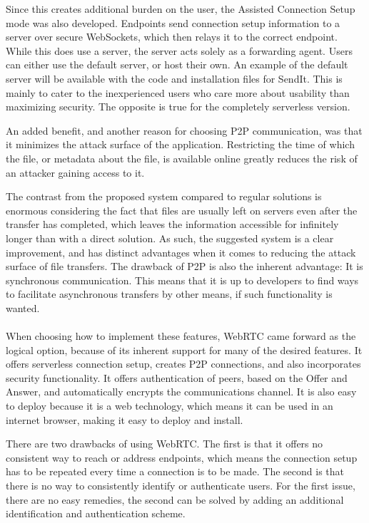 Since this creates additional burden on the user, the Assisted Connection Setup mode was also developed. Endpoints send connection setup information to a server over secure WebSockets, which then relays it to the correct endpoint. While this does use a server, the server acts solely as a forwarding agent. Users can either use the default server, or host their own. An example of the default server will be available with the code and installation files for SendIt. This is mainly to cater to the inexperienced users who care more about usability than maximizing security. The opposite is true for the completely serverless version.

An added benefit, and another reason for choosing P2P communication, was that it minimizes the attack surface of the application. Restricting the time of which the file, or metadata about the file, is available online greatly reduces the risk of an attacker gaining access to it.

The contrast from the proposed system compared to regular solutions is enormous considering the fact that files are usually left on servers even after the transfer has completed, which leaves the information accessible for infinitely longer than with a direct solution. As such, the suggested system is a clear improvement, and has distinct advantages when it comes to reducing the attack surface of file transfers. The drawback of P2P is also the inherent advantage: It is synchronous communication. This means that it is up to developers to find ways to facilitate asynchronous transfers by other means, if such functionality is wanted.
%
\paragraph{}
%
When choosing how to implement these features, WebRTC came forward as the logical option, because of its inherent support for many of the desired features. It offers serverless connection setup, creates P2P connections, and also incorporates security functionality.  It offers authentication of peers, based on the Offer and Answer, and automatically encrypts the communications channel. It is also easy to deploy because it is a web technology, which means it can be used in an internet browser, making it easy to deploy and install.

There are two drawbacks of using WebRTC. The first is that it offers no consistent way to reach or address endpoints, which means the connection setup has to be repeated every time a connection is to be made. The second is that there is no way to consistently identify or authenticate users. For the first issue, there are no easy remedies, the second can be solved by adding an additional identification and authentication scheme.
%
